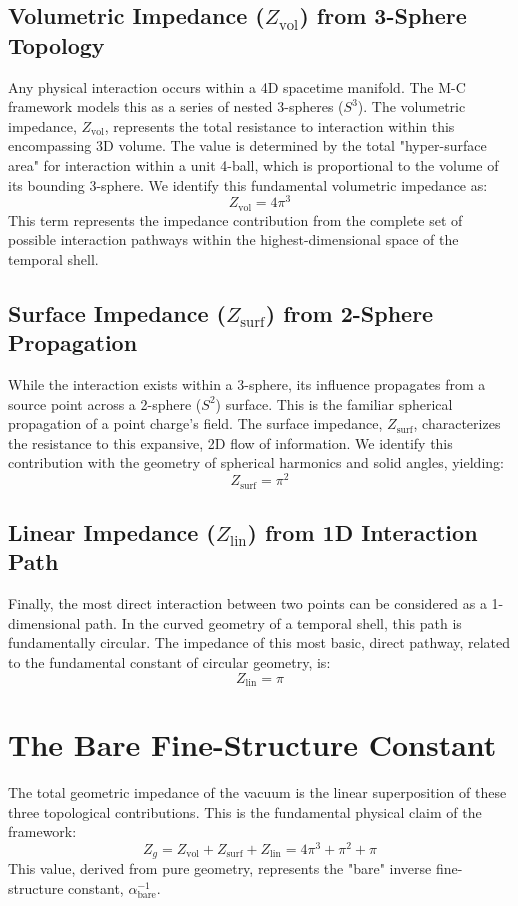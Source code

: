 \documentclass[11pt,a4paper]{article}
\begin{document}
\subsection{Volumetric Impedance ($Z_{\text{vol}}$) from 3-Sphere Topology}
Any physical interaction occurs within a 4D spacetime manifold. The M-C framework models this as a series of nested 3-spheres ($S^3$). The volumetric impedance, $Z_{\text{vol}}$, represents the total resistance to interaction within this encompassing 3D volume. The value is determined by the total "hyper-surface area" for interaction within a unit 4-ball, which is proportional to the volume of its bounding 3-sphere. We identify this fundamental volumetric impedance as:
\begin{equation}
    Z_{\text{vol}} = 4\pi^3
\end{equation}
This term represents the impedance contribution from the complete set of possible interaction pathways within the highest-dimensional space of the temporal shell.

\subsection{Surface Impedance ($Z_{\text{surf}}$) from 2-Sphere Propagation}
While the interaction exists within a 3-sphere, its influence propagates from a source point across a 2-sphere ($S^2$) surface. This is the familiar spherical propagation of a point charge's field. The surface impedance, $Z_{\text{surf}}$, characterizes the resistance to this expansive, 2D flow of information. We identify this contribution with the geometry of spherical harmonics and solid angles, yielding:
\begin{equation}
    Z_{\text{surf}} = \pi^2
\end{equation}

\subsection{Linear Impedance ($Z_{\text{lin}}$) from 1D Interaction Path}
Finally, the most direct interaction between two points can be considered as a 1-dimensional path. In the curved geometry of a temporal shell, this path is fundamentally circular. The impedance of this most basic, direct pathway, related to the fundamental constant of circular geometry, is:
\begin{equation}
    Z_{\text{lin}} = \pi
\end{equation}

\section{The Bare Fine-Structure Constant}
The total geometric impedance of the vacuum is the linear superposition of these three topological contributions. This is the fundamental physical claim of the framework:
\begin{equation}
    Z_g = Z_{\text{vol}} + Z_{\text{surf}} + Z_{\text{lin}} = 4\pi^3 + \pi^2 + \pi
\end{equation}
This value, derived from pure geometry, represents the "bare" inverse fine-structure constant, $\alpha^{-1}_{\text{bare}}$.
\end{document}
